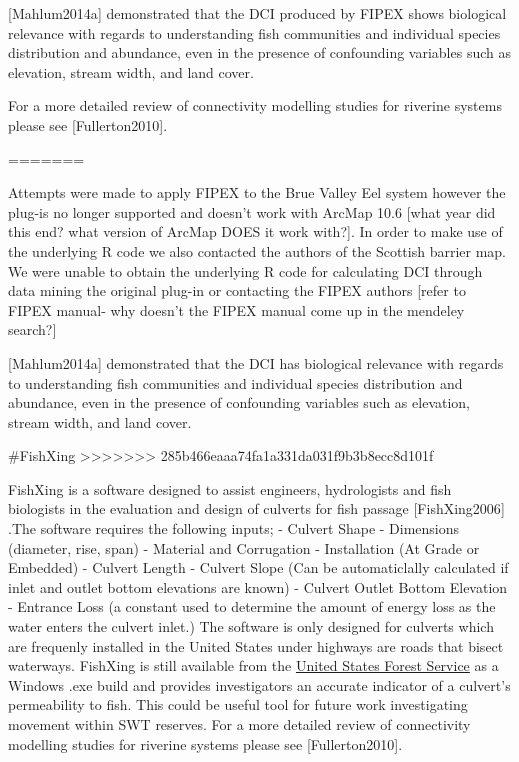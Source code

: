\documentclass[]{article}
\begin{document}
{[}Mahlum2014a{]} demonstrated that the DCI produced by FIPEX shows
biological relevance with regards to understanding fish communities and
individual species distribution and abundance, even in the presence of
confounding variables such as elevation, stream width, and land cover.

For a more detailed review of connectivity modelling studies for
riverine systems please see {[}Fullerton2010{]}.

=======

Attempts were made to apply FIPEX to the Brue Valley Eel system however
the plug-is no longer supported and doesn't work with ArcMap 10.6
{[}what year did this end? what version of ArcMap DOES it work with?{]}.
In order to make use of the underlying R code we also contacted the
authors of the Scottish barrier map. We were unable to obtain the
underlying R code for calculating DCI through data mining the original
plug-in or contacting the FIPEX authors {[}refer to FIPEX manual- why
doesn't the FIPEX manual come up in the mendeley search?{]}

{[}Mahlum2014a{]} demonstrated that the DCI has biological relevance
with regards to understanding fish communities and individual species
distribution and abundance, even in the presence of confounding
variables such as elevation, stream width, and land cover.

\#FishXing
\textgreater{}\textgreater{}\textgreater{}\textgreater{}\textgreater{}\textgreater{}\textgreater{}
285b466eaaa74fa1a331da031f9b3b8ecc8d101f

FishXing is a software designed to assist engineers, hydrologists and
fish biologists in the evaluation and design of culverts for fish
passage {[}FishXing2006{]} .The software requires the following inputs;
- Culvert Shape - Dimensions (diameter, rise, span) - Material and
Corrugation - Installation (At Grade or Embedded) - Culvert Length -
Culvert Slope (Can be automaticlally calculated if inlet and outlet
bottom elevations are known) - Culvert Outlet Bottom Elevation -
Entrance Loss (a constant used to determine the amount of energy loss as
the water enters the culvert inlet.) The software is only designed for
culverts which are frequenly installed in the United States under
highways are roads that bisect waterways. FishXing is still available
from the \href{https://www.fs.fed.us/biology/nsaec/fishxing/}{United
States Forest Service} as a Windows .exe build and provides
investigators an accurate indicator of a culvert's permeability to fish.
This could be useful tool for future work investigating movement within
SWT reserves. For a more detailed review of connectivity modelling
studies for riverine systems please see {[}Fullerton2010{]}.
\end{document}

